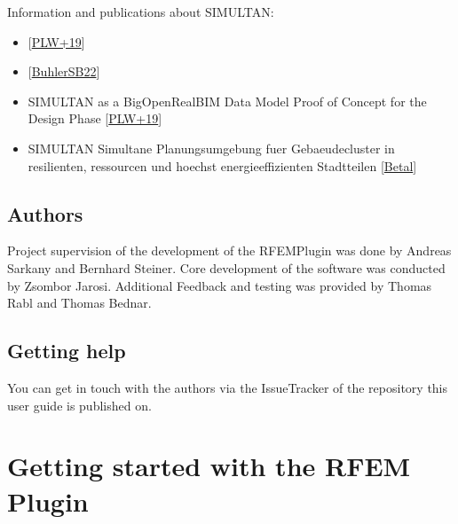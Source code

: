 \documentclass[letterpaper,10pt,english]{jupyterBook}
\begin{document}
\sphinxAtStartPar
Information and publications about SIMULTAN:
\begin{itemize}
\item {} 
\sphinxAtStartPar
{}
{[}\hyperlink{cite.References:id8}{PLW+19}{]}

\item {} 
\sphinxAtStartPar
{} {[}\hyperlink{cite.References:id5}{BuhlerSB22}{]}

\item {} 
\sphinxAtStartPar
SIMULTAN as a Big\sphinxhyphen{}Open\sphinxhyphen{}Real\sphinxhyphen{}BIM Data Model \sphinxhyphen{} Proof of Concept for the Design Phase
{[}\hyperlink{cite.References:id8}{PLW+19}{]}

\item {} 
\sphinxAtStartPar
SIMULTAN \sphinxhyphen{} Simultane Planungsumgebung fuer Gebaeudecluster in resilienten, ressourcen\sphinxhyphen{} und hoechst energieeffizienten
Stadtteilen {[}\hyperlink{cite.References:id4}{Betal}{]}

\end{itemize}


\section{Authors}
\label{\detokenize{Introduction:authors}}
\sphinxAtStartPar
Project supervision of the development of the RFEM\sphinxhyphen{}Plugin was done by Andreas Sarkany and Bernhard Steiner. Core
development of the software was conducted by Zsombor Jarosi. Additional Feedback and testing was provided by Thomas Rabl
and Thomas Bednar.


\section{Getting help}
\label{\detokenize{Introduction:getting-help}}
\sphinxAtStartPar
You can get in touch with the authors via the Issue\sphinxhyphen{}Tracker of the repository this user guide is published on.

\sphinxstepscope


\chapter{Getting started with the RFEM Plugin}
\label{\detokenize{Getting_started_with_the_RFem_Plugin:getting-started-with-the-rfem-plugin}}\label{\detokenize{Getting_started_with_the_RFem_Plugin:id1}}\label{\detokenize{Getting_started_with_the_RFem_Plugin::doc}}
\end{document}
